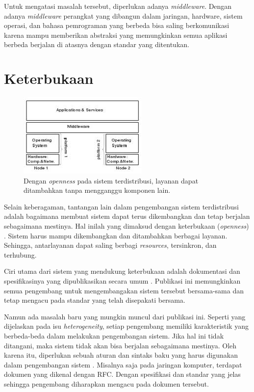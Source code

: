 \documentclass[12pt,a4paper]{apa}
\begin{document}
		
		Untuk mengatasi masalah tersebut, diperlukan adanya \emph{middleware}. Dengan adanya \emph{middleware} perangkat yang dibangun dalam jaringan, hardware, sistem operasi, dan bahasa pemrograman yang berbeda bisa saling berkomunikasi karena mampu memberikan abstraksi yang memungkinkan semua aplikasi berbeda berjalan di atasnya dengan standar yang ditentukan. \cite{Coulouris2012}
	\section{\textbf{Keterbukaan}}
	\begin{figure}[h]
	\centering
	\includegraphics[width=0.5\linewidth]{img/openness}
	\caption{Dengan \emph{openness} pada sistem terdistribusi, layanan dapat ditambahkan tanpa mengganggu komponen lain.}
	\label{fig:openness}
	\end{figure}

	Selain keberagaman, tantangan lain dalam pengembangan sistem terdistribusi adalah bagaimana membuat sistem dapat terus dikembangkan dan tetap berjalan sebagaimana mestinya. Hal inilah yang dimaksud dengan keterbukaan (\emph{openness}) \cite{Coulouris2012}. Sistem harus mampu dikembangkan dan ditambahkan berbagai layanan. Sehingga, antarlayanan dapat saling berbagi \emph{resources}, tersinkron, dan terhubung. \cite{Coulouris2012}
	
	Ciri utama dari sistem yang mendukung keterbukaan adalah dokumentasi dan spesifikasinya yang dipublikasikan secara umum \cite{Kamalapur2008}. Publikasi ini memungkinkan semua pengembang untuk  mengembangakan sistem tersebut bersama-sama dan tetap mengacu pada standar yang telah disepakati bersama.
	
	Namun ada masalah baru yang mungkin muncul dari publikasi ini. Seperti yang dijelaskan pada isu \emph{heterogeneity}, setiap pengembang memiliki karakteristik yang berbeda-beda dalam melakukan pengembangan sistem. Jika hal ini tidak ditangani, maka sistem tidak akan bisa berjalan sebagaimana mestinya. Oleh karena itu, diperlukan sebuah aturan dan sintaks baku yang harus digunakan dalam pengembangan sistem \cite{Tanenbaum2007}. Misalnya saja pada jaringan komputer, terdapat dokumen yang dikenal dengan RFC. Dengan spesifikasi dan standar yang jelas sehingga pengembang diharapkan mengacu pada dokumen tersebut.
	
\end{document}
